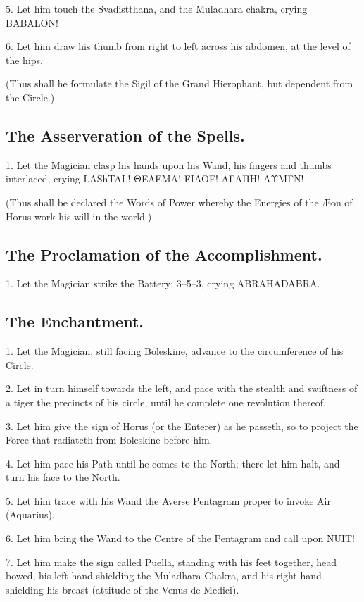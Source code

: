 5. Let him touch the Svadistthana, and the Muladhara chakra, crying BABALON!

6. Let him draw his thumb from right to left across his abdomen, at the level of the hips.

(Thus shall he formulate the Sigil of the Grand Hierophant, but dependent from the Circle.)

\subsection*{The Asserveration of the Spells.}

1. Let the Magician clasp his hands upon his Wand, his fingers and thumbs interlaced, crying LAShTAL! \textgreek{ΘΕΛΕΜΑ}! \textgreek{FIAOF}! \textgreek{ΑΓΑΠΗ}! \textgreek{ΑΥΜΓΝ}!

(Thus shall be declared the Words of Power whereby the Energies of the \AE{}on of Horus work his will in the world.)

\subsection*{The Proclamation of the Accomplishment.}

1. Let the Magician strike the Battery: 3–5–3, crying ABRAHADABRA.

\subsection*{The Enchantment.}

1. Let the Magician, still facing Boleskine, advance to the circumference of his Circle.

2. Let in turn himself towards the left, and pace with the stealth and swiftness of a tiger the precincts of his circle, until he complete one revolution thereof.

3. Let him give the sign of Horus (or the Enterer) as he passeth, so to project the Force that radiateth from Boleskine before him.

4. Let him pace his Path until he comes to the North; there let him halt, and turn his face to the North.

5. Let him trace with his Wand the Averse Pentagram proper to invoke Air (Aquarius).

6. Let him bring the Wand to the Centre of the Pentagram and call upon NUIT!

7. Let him make the sign called Puella, standing with his feet together, head bowed, his left hand shielding the Muladhara Chakra, and his right hand shielding his breast (attitude of the Venus de Medici).


